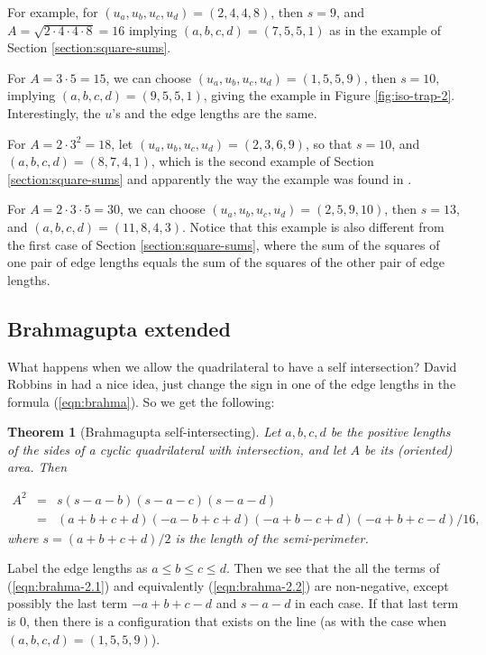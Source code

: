 \documentclass[11pt]{article}
\newtheorem{theorem}{Theorem}[section]
\numberwithin{equation}{section}
\numberwithin{figure}{section}
\begin{document}
 For example, for $(u_a, u_b, u_c, u_d) =(2, 4, 4, 8)$, then $s=9$, and $A=\sqrt{2\cdot4 \cdot4\cdot8}=16$ implying $(a,b,c,d)= (7, 5, 5, 1)$ as in the example of Section \ref{section:square-sums}.  
 
 For $A=3\cdot5=15$, we can choose $(u_a, u_b, u_c, u_d) =(1, 5, 5, 9)$, then $s=10$, implying $(a,b,c,d)= (9, 5, 5, 1)$, giving the example in Figure \ref{fig:iso-trap-2}. Interestingly, the $u$'s and the edge lengths are the same.
 
 For $A=2\cdot3^2=18$, let $(u_a, u_b, u_c, u_d) =(2, 3, 6, 9)$,  so that $s=10$, and $(a,b,c,d)= (8, 7, 4, 1)$,  which is the second example of Section \ref{section:square-sums} and apparently the way the example was found in \cite{Niven-max-min}.
 
 For $A=2\cdot3\cdot5=30$, we can choose $(u_a, u_b, u_c, u_d) =(2, 5, 9,10)$, then $s= 13$, and $(a,b,c,d)= (11, 8, 4, 3)$.  Notice that this example is also different from the first case of Section \ref{section:square-sums}, where the sum of the squares of one pair of edge lengths equals the sum of the squares of the other pair of edge lengths. 


\subsection{Brahmagupta extended}\label{section:brahma-extended}

What happens when we allow the quadrilateral to have a self intersection?  David Robbins in \cite{Robbins-Monthly, Robbins-DCG} had a nice idea,  just change the sign in one of the edge lengths in the formula (\ref{eqn:brahma}).  So we get the following:

 \begin{theorem}[Brahmagupta self-intersecting]\label{thm:brahma-2}Let $a,b,c,d$ be the positive lengths of the sides of a cyclic quadrilateral with intersection, and let $A$ be its (oriented) area.  Then
 
 \begin{eqnarray}A^2&=&s(s-a-b)(s-a-c)(s-a-d)				\label{eqn:brahma-2.1}\\
 				&=&(a+b+c+d)(-a-b+c+d)(-a+b-c+d)(-a+b+c-d)/16,\label{eqn:brahma-2.2}
 \end{eqnarray}
 where $s=(a+b+c+d)/2$ is the length of the semi-perimeter.
 \end{theorem}
 
 Label the edge lengths as $a \le b \le c \le d$.  Then we see that the all the terms of (\ref{eqn:brahma-2.1}) and equivalently (\ref{eqn:brahma-2.2}) are non-negative, except possibly the last term $-a+b+c-d$ and $s-a-d$ in each case.  If that last term is $0$, then there is a configuration that exists on the line (as with the case when $(a,b,c,d)=(1,5,5,9)$).  
 
\end{document}
